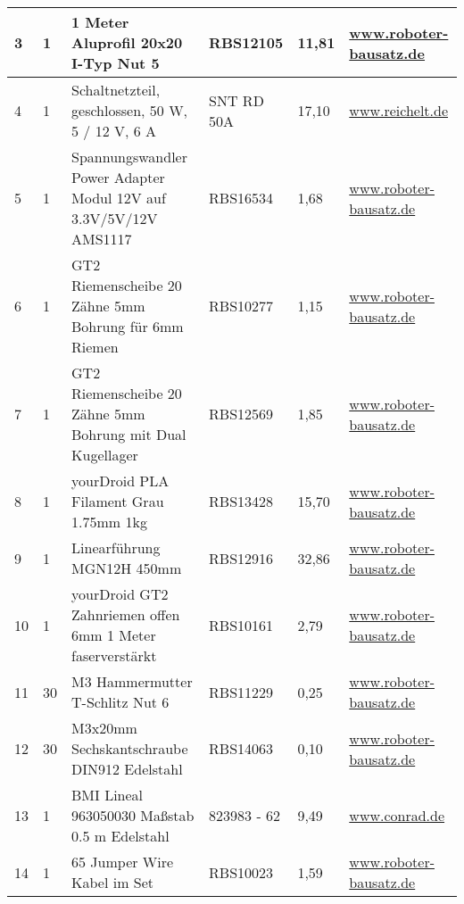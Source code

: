 \documentclass[12pt,a4paper]{scrbook}
\begin{document}
\begin{center}
\begin{tabularx}{\textwidth}{|p{0.4cm}|p{0.4cm}|X|X|p{1cm}|X|}
		3 & 1 & 1 Meter Aluprofil 20x20 I-Typ Nut 5 & RBS12105 & 11,81 & \href{https://www.roboter-bausatz.de/p/1-meter-aluprofil-20x20-i-typ-nut-5}{www.roboter-bausatz.de} \\ 
		\hline
		4 & 1 & Schaltnetzteil, geschlossen, 50 W, 5 / 12 V, 6 A & SNT RD 50A
		 & 17,10 & \href{https://www.reichelt.de}{www.reichelt.de} \\ 
		\hline
		5 & 1 & Spannungswandler Power Adapter Modul 12V auf 3.3V/5V/12V AMS1117
		 & RBS16534 & 1,68 & \href{https://www.roboter-bausatz.de/p/spannungswandler-power-adapter-modul-12v-auf-3.3v-5v-12v-ams1117}{www.roboter-bausatz.de} \\ 
		\hline
		6 & 1 & GT2 Riemenscheibe 20 Zähne 5mm Bohrung für 6mm Riemen & RBS10277 & 1,15 & \href{https://www.roboter-bausatz.de/p/gt2-riemenscheibe-20-zaehne-5mm-bohrung-fuer-6mm-riemen}{www.roboter-bausatz.de} \\ 
		\hline
		7 & 1 & GT2 Riemenscheibe 20 Zähne 5mm Bohrung mit Dual Kugellager & RBS12569 & 1,85 &	\href{https://www.roboter-bausatz.de/p/gt2-riemenscheibe-20-zaehne-5mm-bohrung-mit-dual-kugellager}{www.roboter-bausatz.de} \\ 
		\hline
		8 & 1 & yourDroid PLA Filament Grau 1.75mm 1kg  & RBS13428 & 15,70 & \href{https://www.roboter-bausatz.de/p/yourdroid-pla-filament-grau-1.75mm-1kg}{www.roboter-bausatz.de} \\ 
		\hline
		9 & 1 & Linearführung MGN12H 450mm & RBS12916 & 32,86 & \href{https://www.roboter-bausatz.de/p/linearfuehrung-mgn12h-450mm}{www.roboter-bausatz.de} \\
		\hline
		10 & 1 & yourDroid GT2 Zahnriemen offen 6mm 1 Meter faserverstärkt & RBS10161 & 2,79 & \href{https://www.roboter-bausatz.de/p/yourdroid-gt2-zahnriemen-offen-6mm-1-meter-faserverstaerkt}{www.roboter-bausatz.de} \\
		\hline
		11 & 30 & M3 Hammermutter T-Schlitz Nut 6 &  RBS11229 & 0,25 & \href{https://www.roboter-bausatz.de/p/m3-hammermutter-t-schlitz-nut-6}{www.roboter-bausatz.de} \\
		\hline
		12 & 30 & M3x20mm Sechskantschraube DIN912 Edelstahl & RBS14063 & 0,10 &
		\href{https://www.roboter-bausatz.de/p/m3x20mm-sechskantschraube-din912-edelstahl}{www.roboter-bausatz.de} \\
		\hline
		13 & 1 & BMI Lineal 963050030 Maßstab 0.5 m Edelstahl & 823983 - 62 & 9,49 & \href{https://www.conrad.de/}{www.conrad.de} \\
				\hline
		14 & 1 & 65 Jumper Wire Kabel im Set & RBS10023 & 1,59 & \href{https://www.roboter-bausatz.de/p/65-jumper-wire-kabel-im-set}{www.roboter-bausatz.de} \\

\end{tabularx}
\end{center}
\end{document}
